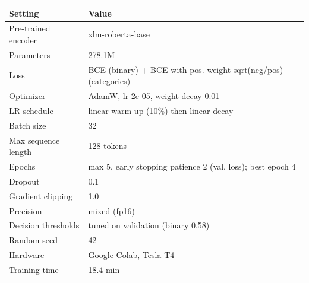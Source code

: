 \begin{tabular}{lp{5.2cm}}
\toprule
Setting & Value \\
\midrule
Pre-trained encoder & xlm-roberta-base \\
Parameters & 278.1M \\
Loss & BCE (binary) + BCE with pos. weight sqrt(neg/pos) (categories) \\
Optimizer & AdamW, lr 2e-05, weight decay 0.01 \\
LR schedule & linear warm-up (10\%) then linear decay \\
Batch size & 32 \\
Max sequence length & 128 tokens \\
Epochs & max 5, early stopping patience 2 (val. loss); best epoch 4 \\
Dropout & 0.1 \\
Gradient clipping & 1.0 \\
Precision & mixed (fp16) \\
Decision thresholds & tuned on validation (binary 0.58) \\
Random seed & 42 \\
Hardware & Google Colab, Tesla T4 \\
Training time & 18.4 min \\
\bottomrule
\end{tabular}
